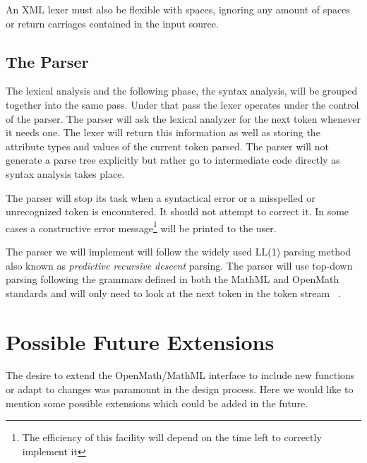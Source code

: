 An XML lexer must also be flexible with spaces, ignoring any amount of spaces or return carriages contained in the input source.

\subsection{The Parser}

The lexical analysis and the following phase, the syntax analysis, will be grouped together into the same pass. Under that pass the lexer operates
under the control of the parser. The parser will ask the lexical analyzer for the next token whenever it needs one. The lexer will return this
information as well as storing the attribute types and values of the current token parsed. The parser will not generate a parse tree explicitly but
rather go to intermediate code directly as syntax analysis takes place.

The parser will stop its task when a syntactical error or a misspelled or unrecognized token is encountered. It should not attempt to correct it.
In some cases a constructive error message\footnote{The efficiency of this facility will depend on the time left to correctly implement it} will be
printed to the user.

The parser we will implement will follow the widely used LL(1) parsing method also known as {\it predictive recursive descent} parsing. The parser
will use top-down parsing following the grammars defined in both the MathML and OpenMath standards and will only need to look at the next token in
the token stream ~\cite{compilers}.


\section{Possible Future Extensions}

The desire to extend the OpenMath/MathML interface to include new functions or adapt to changes was paramount in the design process. Here we would
like to mention some possible extensions which could be added in the future.

